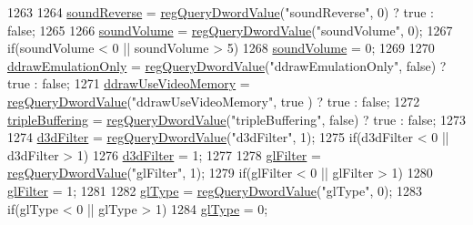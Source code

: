 \begin{DoxyCode}
1263 
1264   \mbox{\hyperlink{gb_sound_8cpp_a34a44cbcbdf585c7e2f1e17948600c1f}{soundReverse}} = \mbox{\hyperlink{_reg_8cpp_a150640889ffff4851ee26d7b999ec7c3}{regQueryDwordValue}}(\textcolor{stringliteral}{"soundReverse"}, 0) ? true : \textcolor{keyword}{false};
1265 
1266   \mbox{\hyperlink{gb_sound_8cpp_a44346dfa73de6666c4727594bb20f6b7}{soundVolume}} = \mbox{\hyperlink{_reg_8cpp_a150640889ffff4851ee26d7b999ec7c3}{regQueryDwordValue}}(\textcolor{stringliteral}{"soundVolume"}, 0);
1267   \textcolor{keywordflow}{if}(soundVolume < 0 || soundVolume > 5)
1268     \mbox{\hyperlink{gb_sound_8cpp_a44346dfa73de6666c4727594bb20f6b7}{soundVolume}} = 0;
1269 
1270   \mbox{\hyperlink{class_v_b_a_a18c0ee1eaa744d8061ce94ce6ed870fd}{ddrawEmulationOnly}} = \mbox{\hyperlink{_reg_8cpp_a150640889ffff4851ee26d7b999ec7c3}{regQueryDwordValue}}(\textcolor{stringliteral}{"ddrawEmulationOnly"}, \textcolor{keyword}{false}) 
      ? true : \textcolor{keyword}{false};
1271   \mbox{\hyperlink{class_v_b_a_a875d3208513412753e2e946b8d6e6ce3}{ddrawUseVideoMemory}} = \mbox{\hyperlink{_reg_8cpp_a150640889ffff4851ee26d7b999ec7c3}{regQueryDwordValue}}(\textcolor{stringliteral}{"ddrawUseVideoMemory"}, \textcolor{keyword}{true}
      ) ? true : \textcolor{keyword}{false};
1272   \mbox{\hyperlink{class_v_b_a_af597e2c2466efdc6365a5d725651b855}{tripleBuffering}} = \mbox{\hyperlink{_reg_8cpp_a150640889ffff4851ee26d7b999ec7c3}{regQueryDwordValue}}(\textcolor{stringliteral}{"tripleBuffering"}, \textcolor{keyword}{false}) ? true : \textcolor{keyword}{
      false};
1273 
1274   \mbox{\hyperlink{class_v_b_a_a8563e53b73a28a011e656f6fc8a4e5ff}{d3dFilter}} = \mbox{\hyperlink{_reg_8cpp_a150640889ffff4851ee26d7b999ec7c3}{regQueryDwordValue}}(\textcolor{stringliteral}{"d3dFilter"}, 1);
1275   \textcolor{keywordflow}{if}(d3dFilter < 0 || d3dFilter > 1)
1276     \mbox{\hyperlink{class_v_b_a_a8563e53b73a28a011e656f6fc8a4e5ff}{d3dFilter}} = 1;
1277 
1278   \mbox{\hyperlink{class_v_b_a_a7861cd60864163f310ae87f746eba9e6}{glFilter}} = \mbox{\hyperlink{_reg_8cpp_a150640889ffff4851ee26d7b999ec7c3}{regQueryDwordValue}}(\textcolor{stringliteral}{"glFilter"}, 1);
1279   \textcolor{keywordflow}{if}(glFilter < 0 || glFilter > 1)
1280     \mbox{\hyperlink{class_v_b_a_a7861cd60864163f310ae87f746eba9e6}{glFilter}} = 1;
1281 
1282   \mbox{\hyperlink{class_v_b_a_afb5faab6c2ddf2661b2fe19f118fd882}{glType}} = \mbox{\hyperlink{_reg_8cpp_a150640889ffff4851ee26d7b999ec7c3}{regQueryDwordValue}}(\textcolor{stringliteral}{"glType"}, 0);
1283   \textcolor{keywordflow}{if}(glType < 0 || glType > 1)
1284     \mbox{\hyperlink{class_v_b_a_afb5faab6c2ddf2661b2fe19f118fd882}{glType}} = 0;

\end{DoxyCode}

